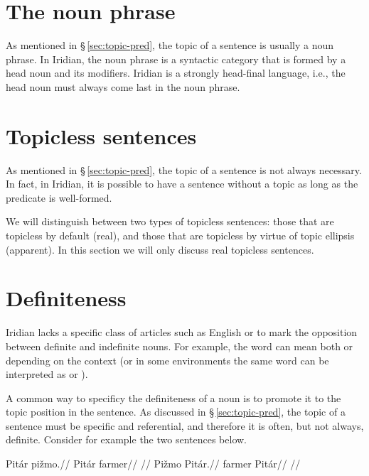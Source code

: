 \section{The noun phrase}

As mentioned in \S\,\ref{sec:topic-pred}, the topic of a sentence is usually a
noun phrase. In Iridian, the noun phrase is a syntactic category that is formed
by a head noun and its modifiers. Iridian is a strongly head-final language,
i.e., the head noun must always come last in the noun phrase.

\section{Topicless sentences}\label{sec:topicless}

As mentioned in \S\,\ref{sec:topic-pred}, the topic of a sentence is not always
necessary. In fact, in Iridian, it is possible to have a sentence without a
topic as long as the predicate is well-formed. 

We will distinguish between two types of topicless sentences: those that are
topicless by default (real), and those that are topicless by virtue of topic
ellipsis (apparent). In this section we will only discuss real topicless
sentences.



\section{Definiteness}\label{sec:definiteness}

Iridian lacks a specific class of articles such as English
 or  to mark the opposition between definite and indefinite
nouns. For example, the word  can mean both  or  depending on the context (or in some environments the same word can be
interpreted as   or ).

A common way to specificy the definiteness of a noun is to promote it to the
topic position in the sentence. As discussed in \S\,\ref{sec:topic-pred}, the
topic of a sentence must be specific and referential, and therefore it is often,
but not always, definite. Consider for example the two sentences below.

\begin{multicols}{2}
  \pex
  \a
  \begingl
  \gla Pitár pižmo.//
  \glb Pitár farmer//
  \glft {}//
  \endgl
  \a
  \begingl
  \gla Pižmo Pitár.//
  \glb farmer Pitár//
  \glft {}//
  \endgl
  \xe
\end{multicols}

